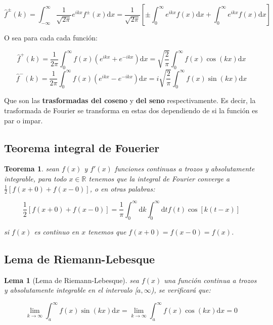 \documentclass[12pt]{book}
\newcommand{\ccorchetes}[1]{\left[ #1  \right]}
\newcommand{\D}{\mathrm{d}}
\newcommand{\inti}{\int_{-\infty}^{\infty}}
\newcommand{\into}{\int_{0}^{\infty}}
\newcommand{\hatf}{\widehat{f}}
\newtheorem{theorem}{Teorema}[section]
\newtheorem{lemma}{Lema}[section]
\begin{document}
\begin{equation}
\hatf^{\pm} (k) = \inti \dfrac{1}{\sqrt{2 \pi}} e^{ikx} f^{\pm} (x) \D x = \dfrac{1}{\sqrt{2 \pi}} \ccorchetes{\pm \int_{0}^\infty e^{ikx} f(x) \D x + \int_{0}^\infty e^{ikx} f (x) \D x }
 \end{equation}
 
O sea para cada cada función:
 
\begin{equation}
\hatf^{+} (k) = \dfrac{1}{2 \pi} \int_0^\infty f(x) (e^{ikx} + e^{-ikx} ) \D x = \sqrt{ \dfrac{2}{\pi} } \int_0^\infty f(x) \cos(kx) \D x
\end{equation}
\begin{equation}
\hatf^{-} (k) = \dfrac{1}{2 \pi} \int_0^\infty f(x) (e^{ikx} - e^{-ikx} ) \D x = i \sqrt{ \dfrac{2}{\pi} }  \int_0^\infty f(x) \sin(kx) \D x
\end{equation}

Que son las \textbf{trasformadas del coseno} y \textbf{del seno} respectivamente. Es decir, la trasformada de Fourier se transforma en estas dos dependiendo de si la función es par o impar.\\


\subsection{Teorema integral de Fouerier}

\begin{theorem}
sean $f(x)$ y $f'(x)$ funciones continuas a trozos y absolutamente integrable, para todo $x \in  \mathbb{R}$ tenemos que la integral de Fourier converge a $\frac{1}{2} \left[ f(x+0) + f(x-0) \right]$, o en otras palabras:

$$  \dfrac{1}{2} \left[ f(x+0) + f(x-0) \right] = \dfrac{1}{\pi} \into \D k \into \D t f(t) \cos [k(t-x)]   $$

si $f(x)$ es continuo en $x$ tenemos que $f(x+0) = f(x-0) = f(x)$. 

\end{theorem}

\subsection{Lema de Riemann-Lebesque}

\begin{lemma}[Lema de Riemann-Lebesque]
sea $f(x)$ una función continua a trozos y absolutamente integrable en el intervalo [$a, \infty$), se verificará que:

$$ \lim_{k \rightarrow \infty} \int_a^\infty f(x)  \sin (k x) \D x  = \lim_{k \rightarrow \infty} \int_a^\infty f(x)  \cos (k x) \D x = 0$$
\end{lemma}
\end{document}
